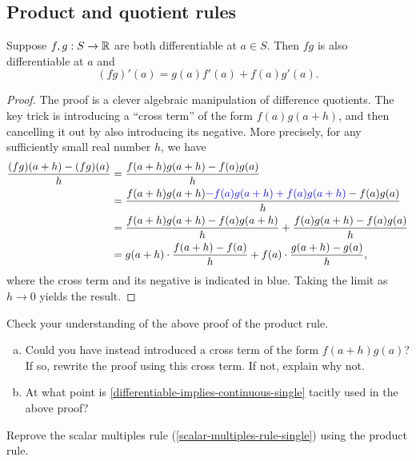 \subsection{Product and quotient rules}

\begin{proposition} \label{product-rule-single} 
	Suppose $f, g : S \to \mathbb{R}$ are both differentiable at $a \in S$. Then $fg$ is also differentiable at $a$ and 
	\[ (fg)'(a) = g(a) f'(a) + f(a)g'(a). \]
\end{proposition}

\begin{proof}
	The proof is a clever algebraic manipulation of difference quotients. The key trick is introducing a ``cross term'' of the form $f(a)g(a+h)$, and then cancelling it out by also introducing its negative. More precisely, for any sufficiently small real number $h$, we have 
	\[ \begin{aligned} \frac{(fg)(a+h)-(fg)(a)}{h} &= \frac{f(a+h)g(a+h) - f(a)g(a)}{h} \\ 
	&= \frac{f(a+h)g(a+h) {\color{blue}-f(a)g(a+h) + f(a)g(a+h)} - f(a)g(a)}{h} \\
	&= \frac{f(a+h)g(a+h) - f(a)g(a+h)}{h} + \frac{f(a)g(a+h) - f(a)g(a)}{h} \\
	&= g(a+h) \cdot \frac{f(a+h) - f(a)}{h} + f(a) \cdot \frac{g(a+h) - g(a)}{h}, \end{aligned} \]
	where the cross term and its negative is indicated in blue. 
	Taking the limit as $h \to 0$ yields the result. 
\end{proof}

\begin{exercise}
	Check your understanding of the above proof of the product rule. 
\begin{enumerate}[(a)]
	\item Could you have instead introduced a cross term of the form $f(a+h)g(a)$? If so, rewrite the proof using this cross term. If not, explain why not. 
	\item At what point is \cref{differentiable-implies-continuous-single} tacitly used in the above proof?
\end{enumerate}
\end{exercise}

\begin{exercise}
	 Reprove the scalar multiples rule (\cref{scalar-multiples-rule-single}) using the product rule. 
\end{exercise}


